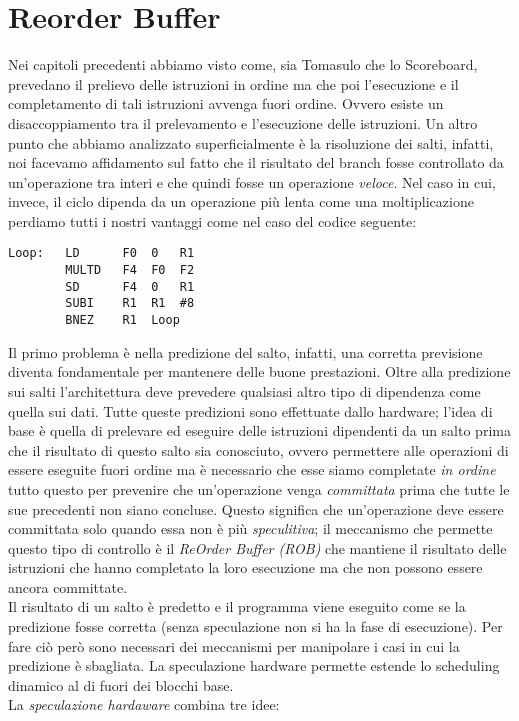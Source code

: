 \section{Reorder Buffer}\label{capitolo5}
Nei capitoli precedenti abbiamo visto come, sia Tomasulo che lo Scoreboard, prevedano il prelievo delle istruzioni in ordine ma che poi l'esecuzione e il completamento di tali istruzioni avvenga fuori ordine. Ovvero esiste un disaccoppiamento tra il prelevamento e l'esecuzione delle istruzioni. Un altro punto che abbiamo analizzato superficialmente è la risoluzione dei salti, infatti, noi facevamo affidamento sul fatto che il risultato del branch fosse controllato da un'operazione tra interi e che quindi fosse un operazione \emph{veloce}. Nel caso in cui, invece, il ciclo dipenda da un operazione più lenta come una moltiplicazione perdiamo tutti i nostri vantaggi come nel caso del codice seguente:
\begin{verbatim}
Loop:	LD 		F0	0	R1
		MULTD	F4	F0	F2
		SD		F4	0	R1
		SUBI	R1	R1	#8
		BNEZ	R1	Loop
\end{verbatim}
Il primo problema è nella predizione del salto, infatti, una corretta previsione diventa fondamentale per mantenere delle buone prestazioni. Oltre alla predizione sui salti l'architettura deve prevedere qualsiasi altro tipo di dipendenza come quella sui dati. Tutte queste predizioni sono effettuate dallo hardware; l'idea di base è quella di prelevare ed eseguire delle istruzioni dipendenti da un salto prima che il risultato di questo salto sia conosciuto, ovvero permettere alle operazioni di essere eseguite fuori ordine ma è necessario che esse siamo completate \emph{in ordine} tutto questo per prevenire che un'operazione venga \emph{committata} prima che tutte le sue precedenti non siano concluse. Questo significa che un'operazione deve essere committata solo quando essa non è più \emph{speculitiva}; il meccanismo che permette questo tipo di controllo è il \emph{ReOrder Buffer (ROB)} che mantiene il risultato delle istruzioni che hanno completato la loro esecuzione ma che non possono essere ancora committate.\\
Il risultato di un salto è predetto e il programma viene eseguito come se la predizione fosse corretta (senza speculazione non si ha la fase di esecuzione). Per fare ciò però sono necessari dei meccanismi per manipolare i casi in cui la predizione è sbagliata. La speculazione hardware permette estende lo scheduling dinamico al di fuori dei blocchi base.\\
La \emph{speculazione hardaware} combina tre idee:
